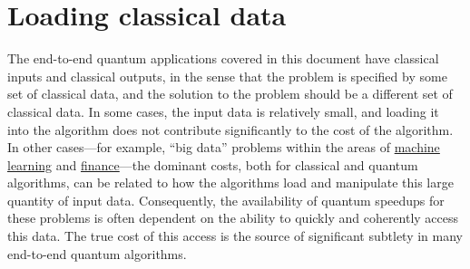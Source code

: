

\section{Loading classical data}\label{prim:LoadingClassicalData}

The end-to-end quantum applications covered in this document have classical inputs and classical outputs, in the sense that the problem is specified by some set of classical data, and the solution to the problem should be a different set of classical data. In some cases, the input data is relatively small, and loading it into the algorithm does not contribute significantly to the cost of the algorithm. In other cases---for example, ``big data'' problems within the areas of \hyperref[appl:ClassicalML]{machine learning} and \hyperref[appl:finance]{finance}---the dominant costs, both for classical and quantum algorithms, can be related to how the algorithms load and manipulate this large quantity of input data. Consequently, the availability of quantum speedups for these problems is often dependent on the ability to quickly and coherently access this data. The true cost of this access is the source of significant subtlety in many end-to-end quantum algorithms. 

\localtableofcontents

\newpage

